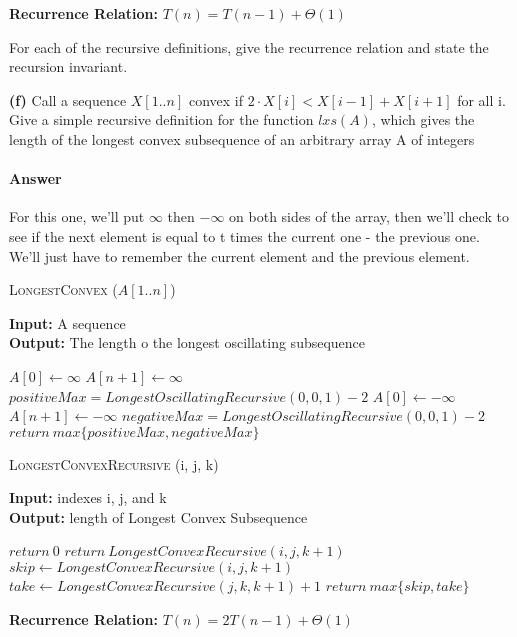 \documentclass{article}
\begin{document}
{\bf Recurrence Relation: } $T(n) = T(n-1) + \Theta(1)$

\todo{}



For each of the recursive definitions, give the recurrence
relation and state the recursion invariant.

{\bf (f)} Call a sequence $X[1.. n]$ convex if $2 \cdot X[i] < X[i-1] + X[i+1]$ for all i.
Give a simple recursive definition for the function $lxs(A)$, which gives
the length of the longest convex subsequence of an arbitrary array A of
integers

\paragraph{Answer}

For this one, we'll put $\infty$ then $-\infty$ on both sides of the array, then we'll check to see
if the next element is equal to t times the current one - the previous one. We'll just have to
remember the current element and the previous element.

\begin{algorithm} \caption{\textsc{LongestConvex} ($A[1..n]$)}\label{alg:seb}
    {\bf Input:} A sequence\\
    {\bf Output:} The length o the longest oscillating subsequence
    \begin{algorithmic}[1]
        \State$A[0] \gets \infty$
        \State$A[n+1] \gets \infty$
        \State$positiveMax = LongestOscillatingRecursive(0, 0, 1) -2$
        \State$A[0] \gets -\infty$
        \State$A[n+1] \gets -\infty$
        \State$negativeMax = LongestOscillatingRecursive(0, 0, 1) -2$
        \State$return\ max\{positiveMax, negativeMax\}$
    \end{algorithmic}
\end{algorithm}

\begin{algorithm} \caption{\textsc{LongestConvexRecursive} (i, j, k)}\label{alg:seb}
    {\bf Input:} indexes i, j, and k\\
    {\bf Output:} length of Longest Convex Subsequence
    \begin{algorithmic}[1]
            \State$return\ 0$
            \State$return\ LongestConvexRecursive(i, j, k +1)$
        \EndIf{}
        \Else{}
            \State$skip \gets LongestConvexRecursive(i, j, k+1)$
            \State$take \gets LongestConvexRecursive(j, k, k+1) +1$
        \State$return\ max\{skip, take\}$
        \EndIf{}
    \end{algorithmic}
\end{algorithm}

{\bf Recurrence Relation: } $T(n) = 2T(n-1) + \Theta(1)$

\todo{}
\end{document}
